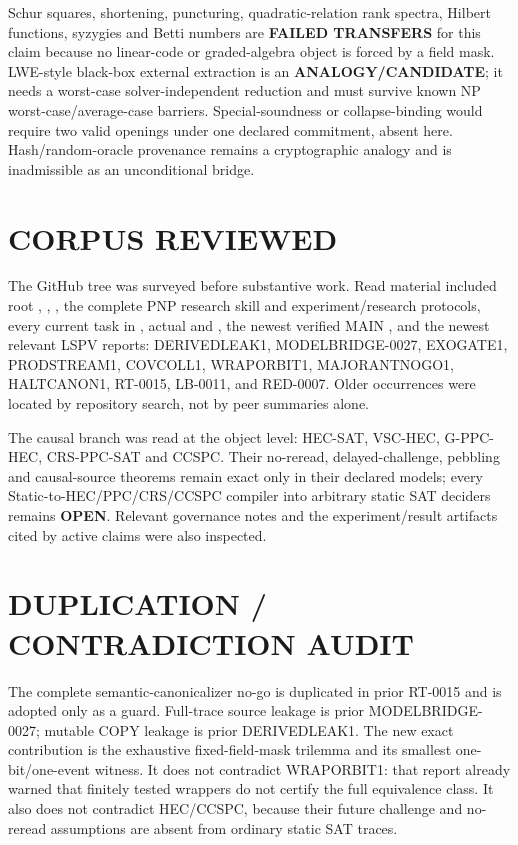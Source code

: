 \documentclass[11pt]{article}
\newcommand{\OPEN}{\textbf{OPEN}}
\begin{document}
Schur squares, shortening, puncturing, quadratic-relation rank spectra,
Hilbert functions, syzygies and Betti numbers are \textbf{FAILED TRANSFERS}
for this claim because no linear-code or graded-algebra object is forced by a
field mask.  LWE-style black-box external extraction is an
\textbf{ANALOGY/CANDIDATE}; it needs a worst-case solver-independent reduction
and must survive known NP worst-case/average-case barriers.  Special-soundness
or collapse-binding would require two valid openings under one declared
commitment, absent here.  Hash/random-oracle provenance remains a
cryptographic analogy and is inadmissible as an unconditional bridge.

\section{CORPUS REVIEWED}

The GitHub tree was surveyed before substantive work.  Read material
included root , , , the complete
PNP research skill and experiment/research protocols, every current task in
, actual  and , the newest
verified MAIN
, and the newest
relevant LSPV reports: DERIVEDLEAK1, MODELBRIDGE-0027, EXOGATE1,
PRODSTREAM1, COVCOLL1, WRAPORBIT1, MAJORANTNOGO1, HALTCANON1, RT-0015,
LB-0011, and RED-0007.  Older occurrences were located by repository search,
not by peer summaries alone.

The causal branch was read at the object level: HEC-SAT, VSC-HEC,
G-PPC-HEC, CRS-PPC-SAT and CCSPC.  Their no-reread, delayed-challenge,
pebbling and causal-source theorems remain exact only in their declared
models; every Static-to-HEC/PPC/CRS/CCSPC compiler into arbitrary static SAT
deciders remains \OPEN.  Relevant governance notes and the experiment/result
artifacts cited by active claims were also inspected.

\section{DUPLICATION / CONTRADICTION AUDIT}

The complete semantic-canonicalizer no-go is duplicated in prior RT-0015 and
is adopted only as a guard.  Full-trace source leakage is prior
MODELBRIDGE-0027; mutable COPY leakage is prior DERIVEDLEAK1.  The new exact
contribution is the exhaustive fixed-field-mask trilemma and its smallest
one-bit/one-event witness.  It does not contradict WRAPORBIT1: that report
already warned that finitely tested wrappers do not certify the full
equivalence class.  It also does not contradict HEC/CCSPC, because their
future challenge and no-reread assumptions are absent from ordinary static
SAT traces.
\end{document}
